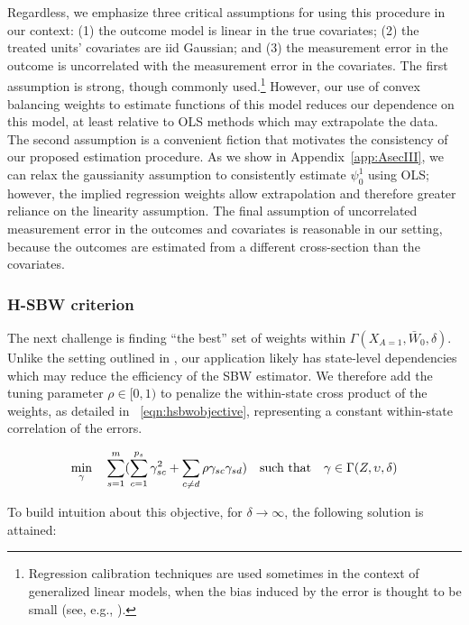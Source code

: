 \documentclass[aoas]{imsart}
\theoremstyle{plain}
\theoremstyle{remark}
\begin{document}
Regardless, we emphasize three critical assumptions for using this procedure in our context: (1) the outcome model is linear in the true covariates; (2) the treated units' covariates are iid Gaussian; and (3) the measurement error in the outcome is uncorrelated with the measurement error in the covariates. The first assumption is strong, though commonly used.\footnote{Regression calibration techniques are used sometimes in the context of generalized linear models, when the bias induced by the error is thought to be small (see, e.g., \cite{}).} However, our use of convex balancing weights to estimate functions of this model reduces our dependence on this model, at least relative to OLS methods which may extrapolate the data. The second assumption is a convenient fiction that motivates the consistency of our proposed estimation procedure. As we show in Appendix~\ref{app:AsecIII}, we can relax the gaussianity assumption to consistently estimate $\psi_0^1$ using OLS; however, the implied regression weights allow extrapolation and therefore greater reliance on the linearity assumption. The final assumption of uncorrelated measurement error in the outcomes and covariates is reasonable in our setting, because the outcomes are estimated from a different cross-section than the covariates. 
 
\subsubsection{H-SBW criterion}\label{sssec:hsbw}

The next challenge is finding ``the best'' set of weights within $\Gamma(X_{A=1}, \bar{W}_0, \delta)$. Unlike the setting outlined in \cite{zubizarreta2015stable}, our application likely has state-level dependencies which may reduce the efficiency of the SBW estimator. We therefore add the tuning parameter $\rho \in [0, 1)$ to penalize the within-state cross product of the weights, as detailed in ~\eqref{eqn:hsbwobjective}, representing a constant within-state correlation of the errors.

\begin{equation}\label{eqn:hsbwobjective}
\min_{\gamma} \quad \sum_{s=1}^{m}(\sum_{c = 1}^{p_s}\gamma_{sc}^2 + \sum_{c \ne d}\rho \gamma_{sc}\gamma_{sd}) \quad \text{such that} \quad \gamma \in \Gamma(Z, \upsilon, \delta)\\
\end{equation}

To build intuition about this objective, for $\delta \to \infty$, the following solution is attained:
\end{document}
